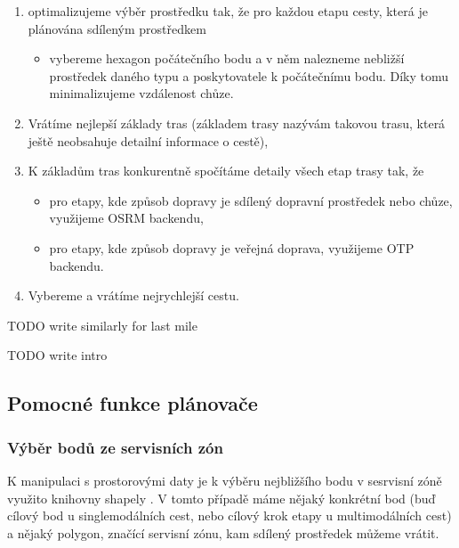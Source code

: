 \documentclass[thesis=M,czech]{FITthesis}[2019/12/23]
\theoremstyle{plain}
\theoremstyle{definition}
\begin{document}
\begin{enumerate}
	\item optimalizujeme výběr prostředku tak, že pro každou etapu cesty, která je plánována sdíleným prostředkem
	\begin{itemize}
		\item vybereme hexagon počátečního bodu a v něm nalezneme nebližší prostředek daného typu a poskytovatele k počátečnímu bodu. Díky tomu minimalizujeme vzdálenost chůze.
	\end{itemize}
	\item Vrátíme nejlepší základy tras (základem trasy nazývám takovou trasu, která ještě neobsahuje detailní informace o cestě),
	\item K základům tras konkurentně spočítáme detaily všech etap trasy tak, že
	\begin{itemize}
		\item pro etapy, kde způsob dopravy je sdílený dopravní prostředek nebo chůze, využijeme OSRM backendu,
		\item pro etapy, kde způsob dopravy je veřejná doprava, využijeme OTP backendu.
	\end{itemize}
	\item Vybereme a vrátíme nejrychlejší cestu.




\end{enumerate}

TODO write similarly for last mile



TODO write intro

\subsection{Pomocné funkce plánovače} 

\subsubsection{Výběr bodů ze servisních zón}\label{vyber-zon}

K manipulaci s prostorovými daty je k výběru nejbližšího bodu v sesrvisní zóně využito knihovny shapely \cite{shapely}. V tomto případě máme nějaký konkrétní bod (buď  cílový bod u singlemodálních cest, nebo cílový krok etapy u multimodálních cest) a nějaký polygon, značící servisní zónu, kam sdílený prostředek můžeme vrátit.
\end{document}
